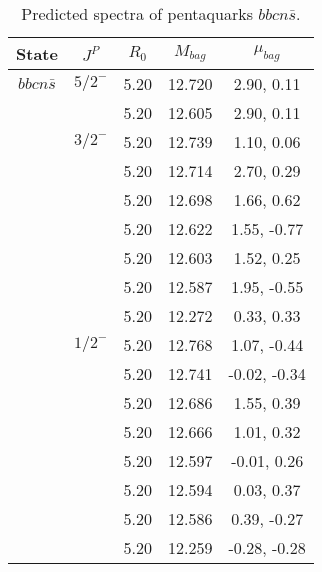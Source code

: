 \documentclass[prd,twocolumn,floatfix,nofootinbib]{revtex4}
\begin{document}
\renewcommand{\tabcolsep}{0.5cm}
\renewcommand{\arraystretch}{1.2}
\begin{table*}[!htbp]
    \caption{Predicted spectra of pentaquarks $bbcn\bar{s}$.}
    \begin{tabular}{ccccc}
        \hline\hline
        {\rm State} &$J^{P}$ &$R_{0}$ &$M_{bag}$ &$\mu_{bag}$ \\ \hline
        ${bbcn\bar{s}}$
            &${5/2}^{-}$    &5.20   &12.720 &2.90, 0.11 \\
            &               &5.20   &12.605 &2.90, 0.11 \\
            &${3/2}^{-}$    &5.20   &12.739 &1.10, 0.06 \\
            &               &5.20   &12.714 &2.70, 0.29 \\
            &               &5.20   &12.698 &1.66, 0.62 \\
            &               &5.20   &12.622 &1.55, -0.77 \\
            &               &5.20   &12.603 &1.52, 0.25 \\
            &               &5.20   &12.587 &1.95, -0.55 \\
            &               &5.20   &12.272 &0.33, 0.33 \\
            &${1/2}^{-}$    &5.20   &12.768 &1.07, -0.44 \\
            &               &5.20   &12.741 &-0.02, -0.34 \\
            &               &5.20   &12.686 &1.55, 0.39 \\
            &               &5.20   &12.666 &1.01, 0.32 \\
            &               &5.20   &12.597 &-0.01, 0.26 \\
            &               &5.20   &12.594 &0.03, 0.37 \\
            &               &5.20   &12.586 &0.39, -0.27 \\
            &               &5.20   &12.259 &-0.28, -0.28 \\
        \hline\hline
    \end{tabular}
\end{table*}
\end{document}
